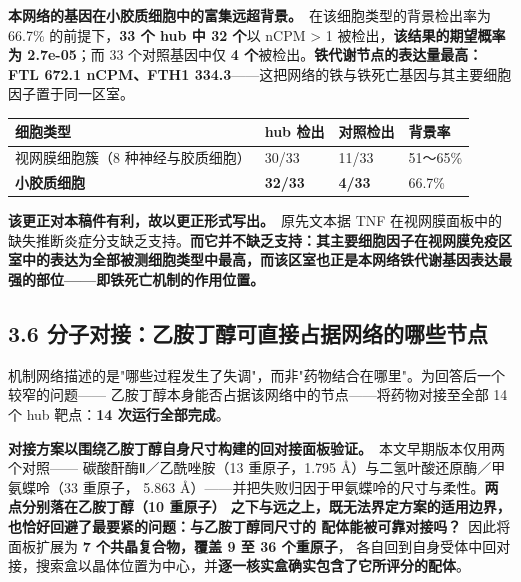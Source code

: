 \documentclass[UTF8,fontset=windows,11pt]{ctexart}
\begin{document}
\textbf{本网络的基因在小胶质细胞中的富集远超背景。}\ 在该细胞类型的背景检出率为 66.7\% 的前提下，\textbf{33 个 hub 中 32 个}以 nCPM > 1 被检出，\textbf{该结果的期望概率为 2.7e-05}；而 33 个对照基因中仅 \textbf{4 个}被检出。\textbf{铁代谢节点的表达量最高：FTL 672.1 nCPM、FTH1 334.3}——这把网络的铁与铁死亡基因与其主要细胞因子置于同一区室。

\begin{center}
\small
\begin{longtable}{p{}p{}p{}p{}}
\hline
细胞类型 & hub 检出 & 对照检出 & 背景率 \\
\hline
视网膜细胞簇（8 种神经与胶质细胞） & 30/33 & 11/33 & 51～65\% \\
\textbf{小胶质细胞} & \textbf{32/33} & \textbf{4/33} & 66.7\% \\
\hline
\end{longtable}
\end{center}

\textbf{该更正对本稿件有利，故以更正形式写出。}\ 原先文本据 TNF 在视网膜面板中的缺失推断炎症分支缺乏支持。\textbf{而它并不缺乏支持：其主要细胞因子在视网膜免疫区室中的表达为全部被测细胞类型中最高，而该区室也正是本网络铁代谢基因表达最强的部位——即铁死亡机制的作用位置。}

\subsection{3.6 分子对接：乙胺丁醇可直接占据网络的哪些节点}

机制网络描述的是"哪些过程发生了失调"，而非"药物结合在哪里"。为回答后一个较窄的问题—— 乙胺丁醇本身能否占据该网络中的节点——将药物对接至全部 14 个 hub 靶点：\textbf{14 次运行全部完成}。

\textbf{对接方案以围绕乙胺丁醇自身尺寸构建的回对接面板验证。}\ 本文早期版本仅用两个对照—— 碳酸酐酶Ⅱ／乙酰唑胺（13 重原子，1.795 Å）与二氢叶酸还原酶／甲氨蝶呤（33 重原子， 5.863 Å）——并把失败归因于甲氨蝶呤的尺寸与柔性。\textbf{两点分别落在乙胺丁醇（10 重原子） 之下与远之上，既无法界定方案的适用边界，也恰好回避了最要紧的问题：与乙胺丁醇同尺寸的 配体能被可靠对接吗？}\ 因此将面板扩展为 \textbf{7 个共晶复合物，覆盖 9 至 36 个重原子}， 各自回到自身受体中回对接，搜索盒以晶体位置为中心，并\textbf{逐一核实盒确实包含了它所评分的配体}。
\end{document}
